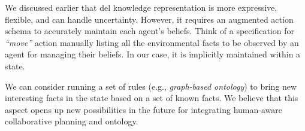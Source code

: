 We discussed earlier that \acrshort{del} knowledge representation is more expressive, flexible, and can handle uncertainty. However, it requires an augmented action schema to accurately maintain each agent's beliefs.
Think of a specification for \textit{``move''} action manually listing all the environmental facts to be observed by an agent for managing their beliefs. In our case, it is implicitly maintained within a state.

We can consider running a set of rules (e.g., \textit{graph-based ontology}) to bring new interesting facts in the state based on a set of known facts. We believe that this aspect opens up new possibilities in the future for integrating human-aware collaborative planning and ontology.



